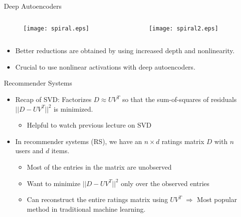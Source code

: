 \begin{frame}{Deep Autoencoders}
\begin{columns}[t]
\begin{column}{.5\textwidth}
\begin{figure}[!]
\centering
\texttt{[image: spiral.eps]}
\end{figure}
\end{column}
\begin{column}{.5\textwidth}
\begin{figure}[!]
\centering
\texttt{[image: spiral2.eps]}
\end{figure}
\end{column}
\end{columns}
\begin{itemize}
\item Better reductions are obtained by using increased depth and
nonlinearity.
\item Crucial to use nonlinear activations with deep autoencoders.
\end{itemize}
\vfill
\end{frame}



\begin{frame}{Recommender Systems}
\begin{itemize}
\item Recap of SVD: Factorizes $D \approx UV^T$ so that the
sum-of-squares  of residuals $|| D- UV^T||^2$  is minimized.
\begin{itemize}
\item Helpful to watch previous lecture on SVD
\end{itemize}
\item In recommender systems (RS), we have an $n \times d$ ratings matrix
$D$ with $n$ users and $d$ items.
\begin{itemize}
\item Most of the entries in the matrix are unobserved
\item Want to minimize $|| D- UV^T||^2$ only over the observed
entries
\item Can reconstruct the entire ratings matrix using $UV^T$
$\Rightarrow$ Most popular method in traditional machine learning.
\end{itemize}
\end{itemize}
\end{frame}


